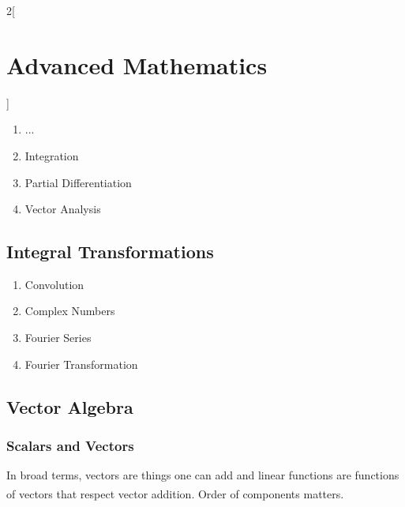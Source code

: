 \documentclass[8pt]{extarticle}
\begin{document}
\begin{multicols}{2}[
        \section{Advanced Mathematics}
    ]
\begin{tcbitemize}[ skin=sectionraster ]
        \label{fig:derivative}

        
    \end{tcbitemize}    
    \begin{enumerate}[label*=\arabic*.]
        \item ...
        \item Integration
        \item Partial Differentiation
        \item Vector Analysis
    \end{enumerate}

    \subsection{Integral Transformations}
    \begin{enumerate}[label*=\arabic*.]
        \item Convolution
        \item Complex Numbers
        \item Fourier Series
        \item Fourier Transformation
    \end{enumerate}

    \subsection{Vector Algebra}
    \subsubsection{Scalars and Vectors}

    \begin{tcbitemize}[ skin=sectionraster ]
        \tcbitem[title=N-Dimensional Vector, raster multicolumn=6]
        In broad terms, vectors are things one can add and linear functions are functions of vectors that respect vector addition\textsuperscript{\cite[][p.12]{cherneyLinearAlgebra2013}}. Order of components matters.


\end{tcbitemize}
\end{multicols}
\end{document}
